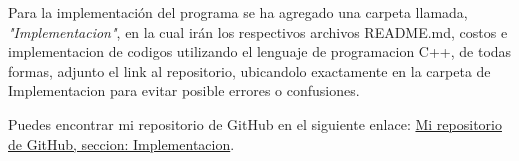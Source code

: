 Para la implementación del programa se ha agregado una carpeta llamada, \textit{"Implementacion"}, en la cual irán los respectivos archivos README.md, costos e implementacion de codigos utilizando el lenguaje de programacion C++, de todas formas, adjunto el link al repositorio, ubicandolo exactamente en la carpeta de Implementacion para evitar posible errores o confusiones.


Puedes encontrar mi repositorio de GitHub en el siguiente enlace: 
\href{https://github.com/rodrigo-ramirezd/Tareas_INF221/tree/main/Tarea_2%263}{Mi repositorio de GitHub, seccion: Implementacion}.